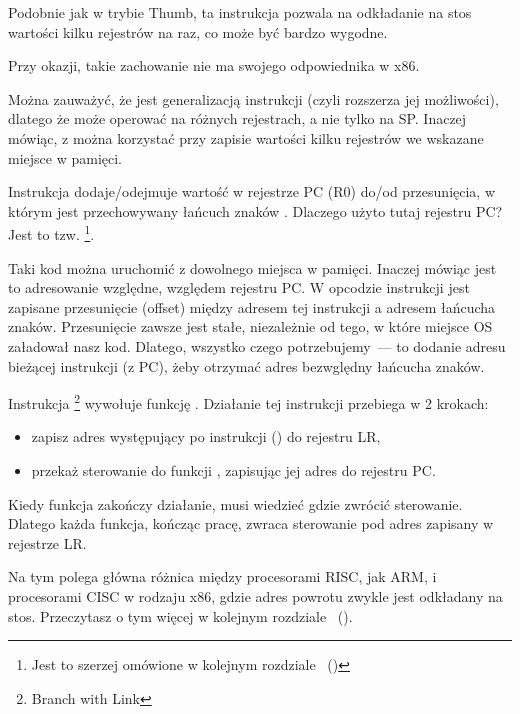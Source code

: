 Podobnie jak \PUSH w trybie Thumb, ta instrukcja pozwala na odkładanie na stos wartości kilku rejestrów na raz, co może być bardzo wygodne.

Przy okazji, takie zachowanie nie ma swojego odpowiednika w x86.

Można zauważyć, że  jest generalizacją instrukcji \PUSH (czyli rozszerza jej możliwości), dlatego że może operować na różnych rejestrach, a nie tylko na \ac{SP}.
Inaczej mówiąc, z  można korzystać przy zapisie wartości kilku rejestrów we wskazane miejsce w pamięci.

\myindex{\PICcode}
Instrukcja  dodaje/odejmuje wartość w rejestrze \ac{PC} (R0) do/od przesunięcia, w którym jest przechowywany łańcuch znaków
.
Dlaczego użyto tutaj rejestru \ac{PC}? Jest to tzw. \q{\PICcode}
\footnote{Jest to szerzej omówione w kolejnym rozdziale ~()}.

Taki kod można uruchomić z dowolnego miejsca w pamięci.
Inaczej mówiąc jest to adresowanie względne, względem rejestru \ac{PC}.
W opcodzie instrukcji  jest zapisane przesunięcie (offset) między adresem tej instrukcji a adresem łańcucha znaków.
Przesunięcie zawsze jest stałe, niezależnie od tego, w które miejsce \ac{OS} załadował nasz kod.
Dlatego, wszystko czego potrzebujemy~--- to dodanie adresu bieżącej instrukcji (z \ac{PC}), żeby otrzymać adres bezwględny łańcucha znaków.

Instrukcja \footnote{Branch with Link} wywołuje funkcję \printf.
Działanie tej instrukcji przebiega w 2 krokach:

\begin{itemize}
\item zapisz adres występujący po instrukcji  () do rejestru \ac{LR},
\item przekaż sterowanie do funkcji \printf, zapisując jej adres do rejestru \ac{PC}.
\end{itemize}

Kiedy funkcja \printf zakończy działanie, musi wiedzieć gdzie zwrócić sterowanie. Dlatego każda funkcja, kończąc pracę, zwraca sterowanie pod adres zapisany w rejestrze \ac{LR}.

Na tym polega główna różnica między  procesorami \ac{RISC}, jak ARM, i procesorami \ac{CISC} w rodzaju x86,
gdzie adres powrotu zwykle jest odkładany na stos. Przeczytasz o tym więcej w kolejnym rozdziale ~().

